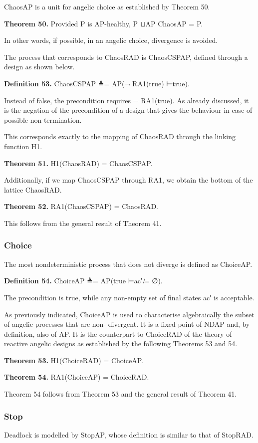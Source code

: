 \documentclass[11pt]{article}
\begin{document}
ChaosAP is a unit for angelic choice as established by Theorem 50.

\noindent\textbf{Theorem 50.} Provided P is AP-healthy, P ⊔AP ChaosAP = P.


In other words, if possible, in an angelic choice, divergence is avoided.

The process that corresponds to ChaosRAD is ChaosCSPAP, defined through a design as shown below.

\noindent\textbf{Definition 53.} ChaosCSPAP ≜= AP(¬ RA1(true) ⊢true).


Instead of false, the precondition requires ¬ RA1(true). As already discussed, it is the negation of the precondition of a design that gives the behaviour in case of possible non-termination.

This corresponds exactly to the mapping of ChaosRAD through the linking function H1.

\noindent\textbf{Theorem 51.} H1(ChaosRAD) = ChaosCSPAP.


Additionally, if we map ChaosCSPAP through RA1, we obtain the bottom of the lattice ChaosRAD.

\noindent\textbf{Theorem 52.} RA1(ChaosCSPAP) = ChaosRAD.


This follows from the general result of Theorem 41.

\subsubsection{Choice}
The most nondeterministic process that does not diverge is defined as ChoiceAP.

\noindent\textbf{Definition 54.} ChoiceAP ≜= AP(true ⊢ac′ ̸= ∅).


The precondition is true, while any non-empty set of final states ac′ is acceptable.

As previously indicated, ChoiceAP is used to characterise algebraically the subset of angelic processes that are non- divergent. It is a fixed point of NDAP and, by definition, also of AP. It is the counterpart to ChoiceRAD of the theory of reactive angelic designs as established by the following Theorems 53 and 54.

\noindent\textbf{Theorem 53.} H1(ChoiceRAD) = ChoiceAP.


\noindent\textbf{Theorem 54.} RA1(ChoiceAP) = ChoiceRAD.


Theorem 54 follows from Theorem 53 and the general result of Theorem 41.

\subsubsection{Stop}
Deadlock is modelled by StopAP, whose definition is similar to that of StopRAD.
\end{document}
